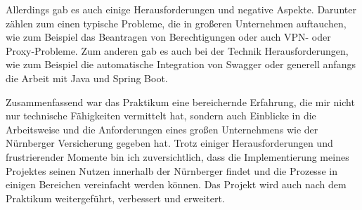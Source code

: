 Allerdings gab es auch einige Herausforderungen und negative Aspekte. Darunter zählen zum einen typische Probleme, die in großeren Unternehmen auftauchen, wie zum Beispiel das Beantragen von Berechtigungen oder auch VPN- oder Proxy-Probleme.
Zum anderen gab es auch bei der Technik Herausforderungen, wie zum Beispiel die automatische Integration von Swagger oder generell anfangs die Arbeit mit Java und Spring Boot.

Zusammenfassend war das Praktikum eine bereichernde Erfahrung, die mir nicht nur technische Fähigkeiten vermittelt hat, sondern auch Einblicke in die Arbeitsweise und die Anforderungen eines großen Unternehmens wie der Nürnberger Versicherung gegeben hat. 
Trotz einiger Herausforderungen und frustrierender Momente bin ich zuversichtlich, dass die Implementierung meines Projektes seinen Nutzen innerhalb der Nürnberger findet und die Prozesse in einigen Bereichen vereinfacht werden können. 
Das Projekt wird auch nach dem Praktikum weitergeführt, verbessert und erweitert.
